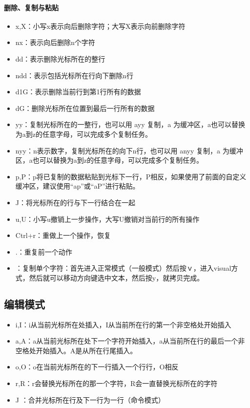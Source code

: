 {\paragraph{删除、复制与粘贴}
\begin{itemize}
\item x,X：小写x表示向后删除字符；大写X表示向前删除字符
\item nx：表示向后删除n个字符
\item dd：表示删除光标所在的整行
\item ndd：表示包括光标所在行向下删除n行
\item d1G：表示删除当前行到第1行所有的数据
\item dG：删除光标所在位置到最后一行所有的数据
\item yy：复制光标所在的一整行，也可以用 ayy 复制，a 为缓冲区，a也可以替换为a到z的任意字母，可以完成多个复制任务。
\item nyy：n表示数字，复制光标所在的向下n行，也可以用 anyy 复制，a 为缓冲区，a也可以替换为a到z的任意字母，可以完成多个复制任务。
\item p,P：p将已复制的数据粘贴到光标下一行，P相反，如果使用了前面的自定义缓冲区，建议使用“ap”或“aP”进行粘贴。
\item J：将光标所在的行与下一行结合在一起
\item u,U：小写u撤销上一步操作，大写U撤销对当前行的所有操作
\item Ctrl+r：重做上一个操作，恢复
\item .：重复前一个动作
\item ：复制单个字符：首先进入正常模式（一般模式）然后按ｖ，进入visual方式，然后就可以移动方向键选中文本，然后按y，就拷贝完成。
\end{itemize}


\subsection{编辑模式}
\begin{itemize}
\item i,I：i从当前光标所在处插入，I从当前所在行的第一个非空格处开始插入
\item a,A：a从当前光标所在处下一个字符开始插入，a从当前所在行的最后一个非空格处开始插入。A是从所在行尾插入。
\item o,O：o在当前光标所在的下一行插入一个行行，O相反
\item r,R：r会替换光标所在的那一个字符，R会一直替换光标所在的字符
\item J ：合并光标所在行及下一行为一行（命令模式）
\end{itemize}



}
